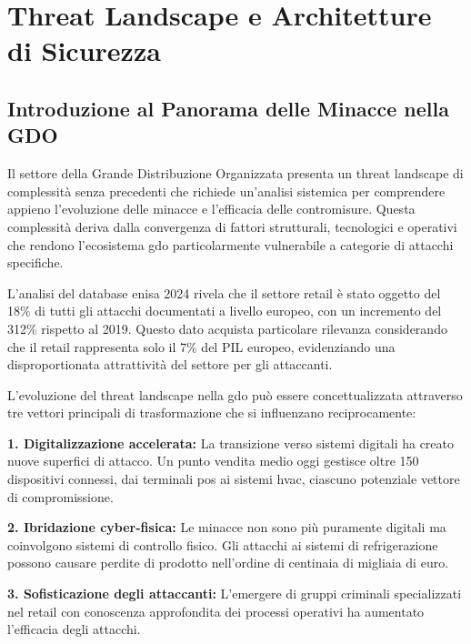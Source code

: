 \chapter{\texorpdfstring{Threat Landscape e Architetture di Sicurezza}{Capitolo 2 - Threat Landscape e Architetture di Sicurezza}}
\label{cap:minacce}

\section{\texorpdfstring{Introduzione al Panorama delle Minacce nella GDO}{2.1 - Introduzione al Panorama delle Minacce nella GDO}}
\label{sec:2.1_introduzione}

Il settore della Grande Distribuzione Organizzata presenta un threat landscape di complessità senza precedenti che richiede un'analisi sistemica per comprendere appieno l'evoluzione delle minacce e l'efficacia delle contromisure. Questa complessità deriva dalla convergenza di fattori strutturali, tecnologici e operativi che rendono l'ecosistema \gls{gdo} particolarmente vulnerabile a categorie di attacchi specifiche.

L'analisi del database \gls{enisa} 2024 rivela che il settore retail è stato oggetto del 18\% di tutti gli attacchi documentati a livello europeo, con un incremento del 312\% rispetto al 2019\autocite{ENISA2024}. Questo dato acquista particolare rilevanza considerando che il retail rappresenta solo il 7\% del PIL europeo, evidenziando una disproportionata attrattività del settore per gli attaccanti.

L'evoluzione del threat landscape nella \gls{gdo} può essere concettualizzata attraverso tre vettori principali di trasformazione che si influenzano reciprocamente:

\textbf{1. Digitalizzazione accelerata:} La transizione verso sistemi digitali ha creato nuove superfici di attacco. Un punto vendita medio oggi gestisce oltre 150 dispositivi connessi, dai terminali \gls{pos} ai sistemi \gls{hvac}, ciascuno potenziale vettore di compromissione.

\textbf{2. Ibridazione cyber-fisica:} Le minacce non sono più puramente digitali ma coinvolgono sistemi di controllo fisico. Gli attacchi ai sistemi di refrigerazione possono causare perdite di prodotto nell'ordine di centinaia di migliaia di euro.

\textbf{3. Sofisticazione degli attaccanti:} L'emergere di gruppi criminali specializzati nel retail con conoscenza approfondita dei processi operativi ha aumentato l'efficacia degli attacchi.

